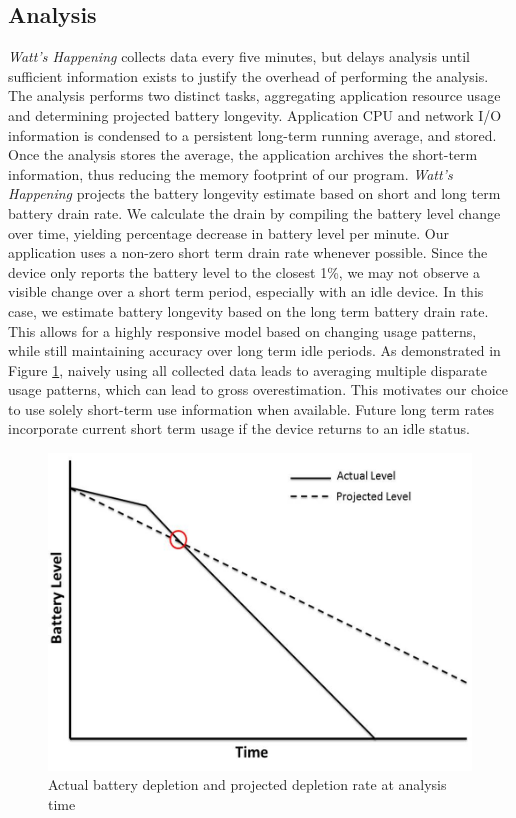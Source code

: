 \subsection{Analysis}
\label{subsec:impl_analysis}
\emph{Watt's Happening} collects data every five minutes, but delays analysis until sufficient information exists to justify the overhead of performing the analysis.
The analysis performs two distinct tasks, aggregating application resource usage and determining projected battery longevity.
Application CPU and network I/O information is condensed to a persistent long-term running average, and stored.
Once the analysis stores the average, the application archives the short-term information, thus reducing the memory footprint of our program.
\emph{Watt's Happening} projects the battery longevity estimate based on short and long term battery drain rate.
We calculate the drain by compiling the battery level change over time, yielding  percentage decrease in battery level per minute. 
Our application uses a non-zero short term drain rate whenever possible.
Since the device only reports the battery level to the closest 1\%, we may not observe a visible change over a short term period, especially with an idle device.
In this case, we estimate battery longevity based on the long term battery drain rate.
This allows for a highly responsive model based on changing usage patterns, while still maintaining accuracy over long term idle periods.
As demonstrated in Figure \ref{fig:bat_v_time}, naively using all collected data leads to averaging multiple disparate usage patterns, which can lead to gross overestimation.  
This motivates our choice to use solely short-term use information when available.
Future long term rates incorporate current short term usage if the device returns to an idle status.
\begin{figure}[ht!]
	\begin{center}
		\includegraphics[width=\columnwidth]{figs/bat_vs_time.png}
		\caption{Actual battery depletion and projected depletion rate at analysis time}
		\label{fig:bat_v_time}
\end{center}
\end{figure}
